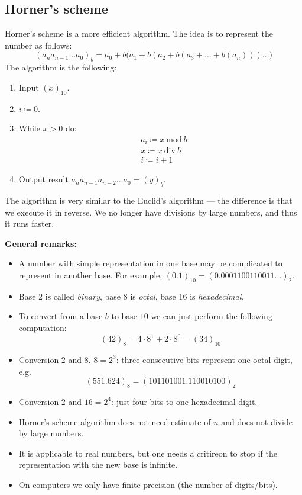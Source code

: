 \subsection{Horner's scheme}
Horner's scheme is a more efficient algorithm. The idea is to represent
the number as follows:
\[
    (a_n a_{n - 1} \dots a_{0})_b = 
    a_0 + b\bigl(a_1 + b(a_2 + b(a_3 + \dots + b (a_n))) \dots \bigr)
\]
The algorithm is the following:
\begin{enumerate}
    \item {
        Input $(x)_{10}$.
    }
    \item {
        $i \coloneqq 0$.
    }
    \item {
        While $x > 0$ do:
        \begin{align*}
            &
            a_i \coloneqq x \ \mathrm{mod}\ b
            \\&
            x \coloneqq x \ \mathrm{div}\ b
            \\&
            i \coloneqq i + 1
        \end{align*}
    }
    \item {
        Output result $a_n a_{n-1} a_{n-2} \dots a_0 = (y)_b$.
    }
\end{enumerate}
\begin{remark}
    The algorithm is very similar to the Euclid's algorithm ---
    the difference is that we execute it in reverse. 
    We no longer have divisions by large numbers, and thus
    it runs faster.
\end{remark}

\textbf{General remarks:}
\begin{itemize}
    \item {
        A number with simple representation in one base 
        may be complicated to represent in another base.
        For example,
        $(0.1)_{10} = (0.0001100110011\dots)_2$.
    }
    \item {
        Base 2 is called \textit{binary},
        base 8 is \textit{octal},
        base 16 is \textit{hexadecimal}.
    }
    \item {
        To convert from a base $b$
        to base $10$ we can just perform the following computation:
        \[
            (42)_8 = 4 \cdot 8^1 + 2 \cdot 8^0 = (34)_{10}
        \]
    }
    \item {
        Conversion $2$ and $8$. $8=2^3$:
        three consecutive bits represent one octal digit, e.g.
        \[ (551.624)_8 = (101 101 001.110 010 100)_2 \]
    }
    \item {
        Conversion $2$ and $16=2^4$: just four bits to one hexadecimal digit. 
    }
    \item {
        Horner's scheme algorithm does not need estimate of $n$
        and does not divide by large numbers.
    }
    \item {
        It is applicable to real numbers, but one needs a critireon to stop
        if the representation with the new base is infinite.
    }
    \item {
        On computers we only have finite precision
        (the number of digits/bits).
    }
\end{itemize}